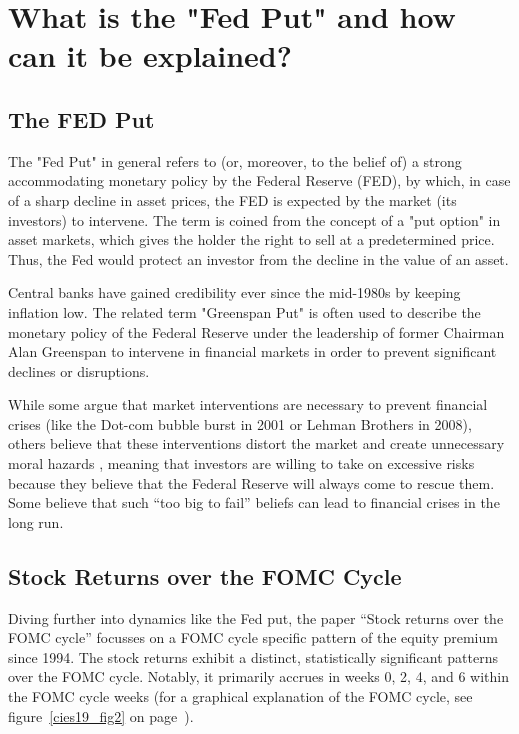 \chapter{What is the "Fed Put" and how can it be explained?}
\section{The FED Put}
The "Fed Put" in general refers to (or, moreover, to the belief of) a strong accommodating monetary policy by the Federal Reserve (FED), by which, in case of a sharp decline in asset prices, the FED is expected by the market (its investors) to intervene. The term is coined from the concept of a "put option" in asset markets, which gives the holder the right to sell at a predetermined price. Thus, the Fed would protect an investor from the decline in the value of an asset.  \parencite{noauthor_fed_nodate-1}

Central banks have gained credibility ever since the mid-1980s by keeping inflation low. The related term "Greenspan Put" is often used to describe the monetary policy of the Federal Reserve under the leadership of former Chairman Alan Greenspan to intervene in financial markets in order to prevent significant declines or disruptions.  \parencite{hall_is_2011}

While some argue that market interventions are necessary to prevent financial crises (like the Dot-com bubble burst in 2001 or Lehman Brothers in 2008), others believe that these interventions distort the market and create unnecessary moral hazards \parencite{cieslak_economics_2021},  meaning that investors are willing to take on excessive risks because they believe that the Federal Reserve will always come to rescue them. Some believe that such “too big to fail” beliefs can lead to financial crises in the long run.

\section{Stock Returns over the FOMC Cycle}

Diving further into dynamics like the Fed put,  the paper “Stock returns over the FOMC cycle” focusses on a FOMC cycle specific pattern of the equity premium since 1994. 
The stock returns exhibit a distinct,  statistically significant patterns over the FOMC cycle.  Notably,  it primarily accrues in weeks 0,  2,  4,  and 6 within the FOMC cycle weeks (for a graphical explanation of the FOMC cycle, see figure~\ref{cies19_fig2} on page~\pageref{cies19_fig2}).

